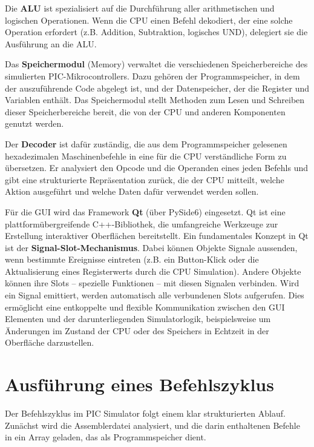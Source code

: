 Die \textbf{\ac{ALU}} ist spezialisiert auf die Durchführung aller arithmetischen und logischen Operationen. Wenn die \ac{CPU} einen Befehl dekodiert, der eine solche Operation erfordert (z.B. Addition, Subtraktion, logisches UND), delegiert sie die Ausführung an die ALU.

Das \textbf{Speichermodul} (Memory) verwaltet die verschiedenen Speicherbereiche des simulierten PIC-Mikrocontrollers. Dazu gehören der Programmspeicher, in dem der auszuführende Code abgelegt ist, und der Datenspeicher, der die Register und Variablen enthält. Das Speichermodul stellt Methoden zum Lesen und Schreiben dieser Speicherbereiche bereit, die von der \ac{CPU} und anderen Komponenten genutzt werden.

Der \textbf{Decoder} ist dafür zuständig, die aus dem Programmspeicher gelesenen hexadezimalen Maschinenbefehle in eine für die \ac{CPU} verständliche Form zu übersetzen. Er analysiert den Opcode und die Operanden eines jeden Befehls und gibt eine strukturierte Repräsentation zurück, die der \ac{CPU} mitteilt, welche Aktion ausgeführt und welche Daten dafür verwendet werden sollen.


Für die \ac{GUI} wird das Framework \textbf{Qt} (über PySide6) eingesetzt. Qt ist eine plattformübergreifende C++-Bibliothek, die umfangreiche Werkzeuge zur Erstellung interaktiver Oberflächen bereitstellt. Ein fundamentales Konzept in Qt ist der \textbf{Signal-Slot-Mechanismus}. Dabei können Objekte Signale aussenden, wenn bestimmte Ereignisse eintreten (z.B. ein Button-Klick oder die Aktualisierung eines Registerwerts durch die \ac{CPU} Simulation). Andere Objekte können ihre Slots – spezielle Funktionen – mit diesen Signalen verbinden. Wird ein Signal emittiert, werden automatisch alle verbundenen Slots aufgerufen. Dies ermöglicht eine entkoppelte und flexible Kommunikation zwischen den \ac{GUI} Elementen und der darunterliegenden Simulatorlogik, beispielsweise um Änderungen im Zustand der \ac{CPU} oder des Speichers in Echtzeit in der Oberfläche darzustellen.


\section{Ausführung eines Befehlszyklus}

Der Befehlszyklus im PIC Simulator folgt einem klar strukturierten Ablauf. Zunächst wird die Assemblerdatei analysiert, und die darin enthaltenen Befehle in ein Array geladen, das als Programmspeicher dient. 

